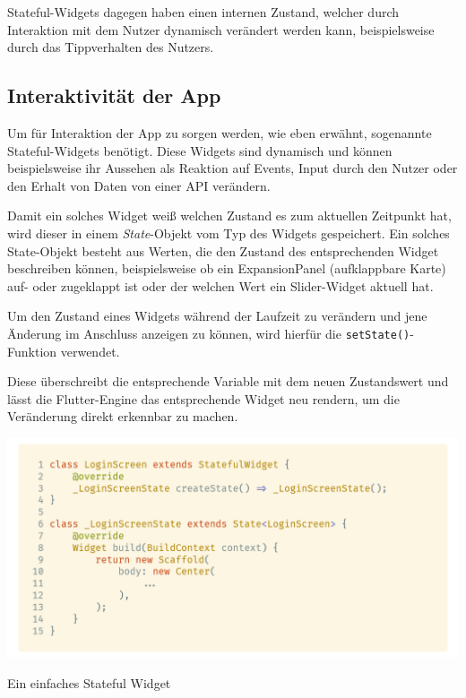 Stateful-Widgets dagegen haben einen internen Zustand, welcher durch Interaktion mit dem Nutzer dynamisch verändert
werden kann, beispielsweise durch das Tippverhalten des Nutzers.

\subsection{Interaktivität der App}


Um für Interaktion der App zu sorgen werden, wie eben erwähnt, sogenannte Stateful-Widgets benötigt. Diese Widgets sind dynamisch und können beispielsweise ihr Aussehen als Reaktion auf Events, Input durch den Nutzer oder den Erhalt von Daten von einer API verändern.

Damit ein solches Widget weiß welchen Zustand es zum aktuellen Zeitpunkt hat, wird dieser in einem \textit{State}-Objekt vom Typ
des Widgets gespeichert. Ein solches State-Objekt besteht aus Werten, die den Zustand des entsprechenden Widget beschreiben können, beispielsweise ob ein ExpansionPanel (aufklappbare Karte) auf- oder zugeklappt ist oder der welchen Wert ein Slider-Widget aktuell hat.

Um den Zustand eines Widgets während der Laufzeit zu verändern und jene Änderung im Anschluss anzeigen zu können, wird hierfür die \lstinline{setState()}-Funktion verwendet.

Diese überschreibt die entsprechende Variable mit dem neuen Zustandswert und lässt die Flutter-Engine das entsprechende
Widget neu rendern, um die Veränderung direkt erkennbar zu machen.

\begin{code}
    \centering
    \includegraphics[width=1\textwidth]{images/Flutter/flutterStatefulWidget.png}
    \vspace{-25pt}
    \caption{Ein einfaches Stateful Widget}
\end{code}

